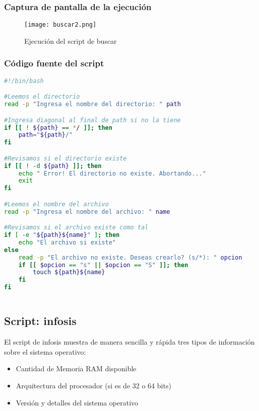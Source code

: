 \documentclass{article}
\begin{document}
\subsubsection{Captura de pantalla de la ejecución}

\begin{figure}[h!]
\centering
\texttt{[image: buscar2.png]}
\caption{Ejecución del script de buscar}
\end{figure}

\subsubsection{Código fuente del script}

\begin{lstlisting}[language=bash]
#!/bin/bash

#Leemos el directorio
read -p "Ingresa el nombre del directorio: " path

#Ingresa diagonal al final de path si no la tiene
if [[ ! ${path} == */ ]]; then
    path="${path}/"
fi

#Revisamos si el directorio existe
if [[ ! -d ${path} ]]; then
    echo " Error! El directorio no existe. Abortando..."
    exit
fi

#Leemos el nombre del archivo
read -p "Ingresa el nombre del archivo: " name

#Revisamos si el archivo existe como tal
if [ -e "${path}${name}" ]; then
    echo "El archivo si existe"
else 
    read -p "El archivo no existe. Deseas crearlo? (s/*): " opcion
    if [[ $opcion == "s" || $opcion == "S" ]]; then
        touch ${path}${name}
    fi
fi 
                                                 
\end{lstlisting}
\pagebreak
\subsection{Script: infosis}

El script de infosis muestra de manera sencilla y rápida tres tipos de información sobre el sistema operativo:

\begin{itemize}
    \item Cantidad de Memoria RAM disponible
    \item Arquitectura del procesador (si es de 32 o 64 bits)
    \item Versión y detalles del sistema operativo
\end{itemize}
\end{document}
